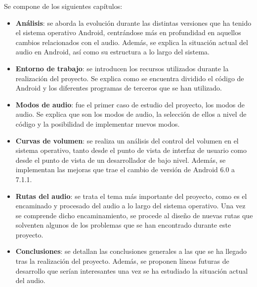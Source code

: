 Se compone de los siguientes capítulos:
\begin{itemize}
	\item{\textbf{Análisis}: se aborda la evolución durante las distintas versiones que ha tenido el sistema operativo Android, centrándose más en profundidad en aquellos cambios relacionados con el audio. Además, se explica la situación actual del audio en Android, así como su estructura a lo largo del sistema.}
	\item{\textbf{Entorno de trabajo}: se introducen los recursos utilizados durante la realización del proyecto. Se explica como se encuentra dividido el código de Android y los diferentes programas de terceros que se han utilizado.}
	\item{\textbf{Modos de audio}: fue el primer caso de estudio del proyecto, los modos de audio. Se explica que son los modos de audio, la selección de ellos a nivel de código y la posibilidad de implementar nuevos modos.}
	\item{\textbf{Curvas de volumen}: se realiza un análisis del control del volumen en el sistema operativo, tanto desde el punto de vista de interfaz de usuario como desde el punto de vista de un desarrollador de bajo nivel. Además, se implementan las mejoras que trae el cambio de versión de Android 6.0 a 7.1.1.}
	\item{\textbf{Rutas del audio}: se trata el tema más importante del proyecto, como es el encaminado y procesado del audio a lo largo del sistema operativo. Una vez se comprende dicho encaminamiento, se procede al diseño de nuevas rutas que solventen algunos de los problemas que se han encontrado durante este proyecto.}
	\item{\textbf{Conclusiones}: se detallan las conclusiones generales a las que se ha llegado tras la realización del proyecto. Además, se proponen líneas futuras de desarrollo que serían interesantes una vez se ha estudiado la situación actual del audio.}
\end{itemize}